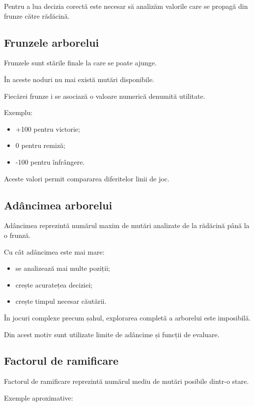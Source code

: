 \documentclass[12pt,a4paper]{article}
\begin{document}
Pentru a lua decizia corectă este necesar să analizăm valorile care se propagă din frunze către rădăcină.

\subsection{Frunzele arborelui}

Frunzele sunt stările finale la care se poate ajunge.

În aceste noduri nu mai există mutări disponibile.

Fiecărei frunze i se asociază o valoare numerică denumită utilitate.

Exemplu:

\begin{itemize}
\item +100 pentru victorie;
\item 0 pentru remiză;
\item -100 pentru înfrângere.
\end{itemize}

Aceste valori permit compararea diferitelor linii de joc.

\subsection{Adâncimea arborelui}

Adâncimea reprezintă numărul maxim de mutări analizate de la rădăcină până la o frunză.

Cu cât adâncimea este mai mare:

\begin{itemize}
\item se analizează mai multe poziții;
\item crește acuratețea deciziei;
\item crește timpul necesar căutării.
\end{itemize}

În jocuri complexe precum șahul, explorarea completă a arborelui este imposibilă.

Din acest motiv sunt utilizate limite de adâncime și funcții de evaluare.

\subsection{Factorul de ramificare}

Factorul de ramificare reprezintă numărul mediu de mutări posibile dintr-o stare.

Exemple aproximative:
\end{document}
